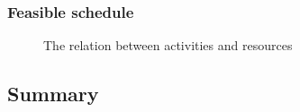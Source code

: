 \documentclass{beamer}
\theoremstyle{definition}
\newcommand{\inputtikz}[1]{}
\begin{document}
\begin{frame}
	\frametitle{Feasible schedule}
	\vspace{-1em}
	\begin{figure}[ht]
		\makebox[\textwidth][c]{\resizebox{.38\paperwidth}{!}{
			\inputtikz{schedule_feasible_profile}
		}}
		\vspace{-1.2em}
		\caption{The relation between activities and resources}
		\label{fig:activity_graph}
	\end{figure}
\end{frame}

\subsection{Summary}
\end{document}
